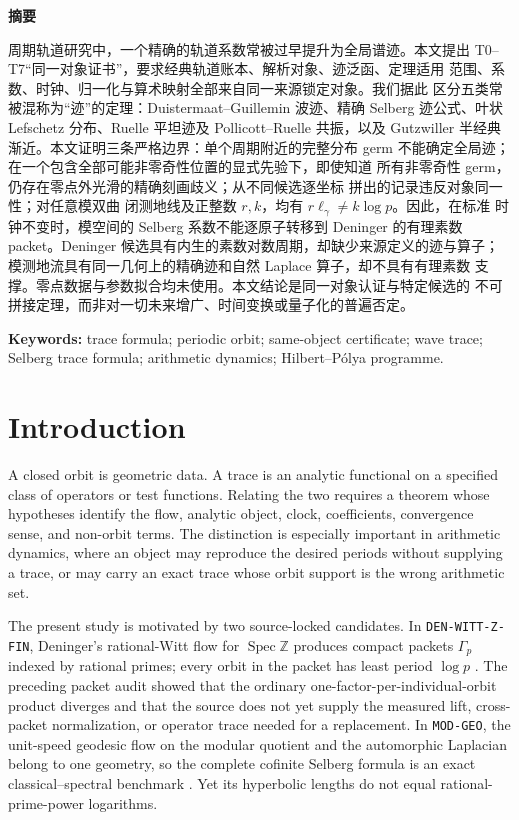\documentclass[11pt]{article}
\theoremstyle{definition}
\theoremstyle{remark}
\newcommand{\Z}{\mathbb{Z}}
\begin{document}
\ifPDFTeX\else
\begin{center}
{\zhfont\bfseries 摘要}
\end{center}
{\zhfont
周期轨道研究中，一个精确的轨道系数常被过早提升为全局谱迹。本文提出
T0--T7“同一对象证书”，要求经典轨道账本、解析对象、迹泛函、定理适用
范围、系数、时钟、归一化与算术映射全部来自同一来源锁定对象。我们据此
区分五类常被混称为“迹”的定理：Duistermaat--Guillemin 波迹、精确 Selberg
迹公式、叶状 Lefschetz 分布、Ruelle 平坦迹及 Pollicott--Ruelle 共振，以及
Gutzwiller 半经典渐近。本文证明三条严格边界：单个周期附近的完整分布 germ
不能确定全局迹；在一个包含全部可能非零奇性位置的显式先验下，即使知道
所有非零奇性 germ，仍存在零点外光滑的精确刻画歧义；从不同候选逐坐标
拼出的记录违反对象同一性；对任意模双曲
闭测地线及正整数 $r,k$，均有 $r\ell_\gamma\ne k\log p$。因此，在标准
时钟不变时，模空间的 Selberg 系数不能逐原子转移到 Deninger 的有理素数
packet。Deninger 候选具有内生的素数对数周期，却缺少来源定义的迹与算子；
模测地流具有同一几何上的精确迹和自然 Laplace 算子，却不具有有理素数
支撑。零点数据与参数拟合均未使用。本文结论是同一对象认证与特定候选的
不可拼接定理，而非对一切未来增广、时间变换或量子化的普遍否定。
}
\fi

\medskip
\noindent\textbf{Keywords:} trace formula; periodic orbit; same-object
certificate; wave trace; Selberg trace formula; arithmetic dynamics;
Hilbert--P\'olya programme.

\section{Introduction}

A closed orbit is geometric data.  A trace is an analytic functional on a
specified class of operators or test functions.  Relating the two requires a
theorem whose hypotheses identify the flow, analytic object, clock,
coefficients, convergence sense, and non-orbit terms.  The distinction is
especially important in arithmetic dynamics, where an object may reproduce
the desired periods without supplying a trace, or may carry an exact trace
whose orbit support is the wrong arithmetic set.

The present study is motivated by two source-locked candidates.  In
\texttt{DEN-WITT-Z-FIN}, Deninger's rational-Witt flow for
\(\operatorname{Spec}\Z\) produces compact packets \(\Gamma_p\) indexed by
rational primes; every orbit in the packet has least period \(\log p\)
\citep{Deninger2026}.  The preceding packet audit showed that the ordinary
one-factor-per-individual-orbit product diverges and that the source does not
yet supply the measured lift, cross-packet normalization, or operator trace
needed for a replacement.  In \texttt{MOD-GEO}, the unit-speed geodesic flow
on the modular quotient and the automorphic Laplacian belong to one geometry,
so the complete cofinite Selberg formula is an exact classical--spectral
benchmark \citep{Selberg1956,Hejhal1983}.  Yet its hyperbolic lengths do not
equal rational-prime-power logarithms.
\end{document}
